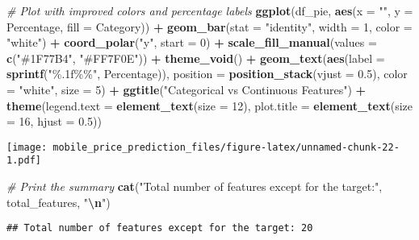 \documentclass[
]{article}
\newenvironment{Shaded}{\begin{snugshade}}{\end{snugshade}}
\newcommand{\AttributeTok}[1]{\textcolor[rgb]{0.13,0.29,0.53}{#1}}
\newcommand{\CommentTok}[1]{\textcolor[rgb]{0.56,0.35,0.01}{\textit{#1}}}
\newcommand{\DecValTok}[1]{\textcolor[rgb]{0.00,0.00,0.81}{#1}}
\newcommand{\FloatTok}[1]{\textcolor[rgb]{0.00,0.00,0.81}{#1}}
\newcommand{\FunctionTok}[1]{\textcolor[rgb]{0.13,0.29,0.53}{\textbf{#1}}}
\newcommand{\NormalTok}[1]{#1}
\newcommand{\SpecialCharTok}[1]{\textcolor[rgb]{0.81,0.36,0.00}{\textbf{#1}}}
\newcommand{\StringTok}[1]{\textcolor[rgb]{0.31,0.60,0.02}{#1}}
\begin{document}
\begin{Shaded}
\begin{Highlighting}[]
\CommentTok{\# Plot with improved colors and percentage labels}
\FunctionTok{ggplot}\NormalTok{(df\_pie, }\FunctionTok{aes}\NormalTok{(}\AttributeTok{x =} \StringTok{""}\NormalTok{, }\AttributeTok{y =}\NormalTok{ Percentage, }\AttributeTok{fill =}\NormalTok{ Category)) }\SpecialCharTok{+}
  \FunctionTok{geom\_bar}\NormalTok{(}\AttributeTok{stat =} \StringTok{"identity"}\NormalTok{, }\AttributeTok{width =} \DecValTok{1}\NormalTok{, }\AttributeTok{color =} \StringTok{"white"}\NormalTok{) }\SpecialCharTok{+}
  \FunctionTok{coord\_polar}\NormalTok{(}\StringTok{"y"}\NormalTok{, }\AttributeTok{start =} \DecValTok{0}\NormalTok{) }\SpecialCharTok{+}
  \FunctionTok{scale\_fill\_manual}\NormalTok{(}\AttributeTok{values =} \FunctionTok{c}\NormalTok{(}\StringTok{"\#1F77B4"}\NormalTok{, }\StringTok{"\#FF7F0E"}\NormalTok{)) }\SpecialCharTok{+}
  \FunctionTok{theme\_void}\NormalTok{() }\SpecialCharTok{+}
  \FunctionTok{geom\_text}\NormalTok{(}\FunctionTok{aes}\NormalTok{(}\AttributeTok{label =} \FunctionTok{sprintf}\NormalTok{(}\StringTok{"\%.1f\%\%"}\NormalTok{, Percentage)), }\AttributeTok{position =} \FunctionTok{position\_stack}\NormalTok{(}\AttributeTok{vjust =} \FloatTok{0.5}\NormalTok{), }\AttributeTok{color =} \StringTok{"white"}\NormalTok{, }\AttributeTok{size =} \DecValTok{5}\NormalTok{) }\SpecialCharTok{+}
  \FunctionTok{ggtitle}\NormalTok{(}\StringTok{"Categorical vs Continuous Features"}\NormalTok{) }\SpecialCharTok{+}
  \FunctionTok{theme}\NormalTok{(}\AttributeTok{legend.text =} \FunctionTok{element\_text}\NormalTok{(}\AttributeTok{size =} \DecValTok{12}\NormalTok{),}
        \AttributeTok{plot.title =} \FunctionTok{element\_text}\NormalTok{(}\AttributeTok{size =} \DecValTok{16}\NormalTok{, }\AttributeTok{hjust =} \FloatTok{0.5}\NormalTok{))}
\end{Highlighting}
\end{Shaded}

\texttt{[image: mobile\_price\_prediction\_files/figure-latex/unnamed-chunk-22-1.pdf]}

\begin{Shaded}
\begin{Highlighting}[]
\CommentTok{\# Print the summary}
\FunctionTok{cat}\NormalTok{(}\StringTok{"Total number of features except for the target:"}\NormalTok{, total\_features, }\StringTok{"}\SpecialCharTok{\textbackslash{}n}\StringTok{"}\NormalTok{)}
\end{Highlighting}
\end{Shaded}

\begin{verbatim}
## Total number of features except for the target: 20
\end{verbatim}
\end{document}
